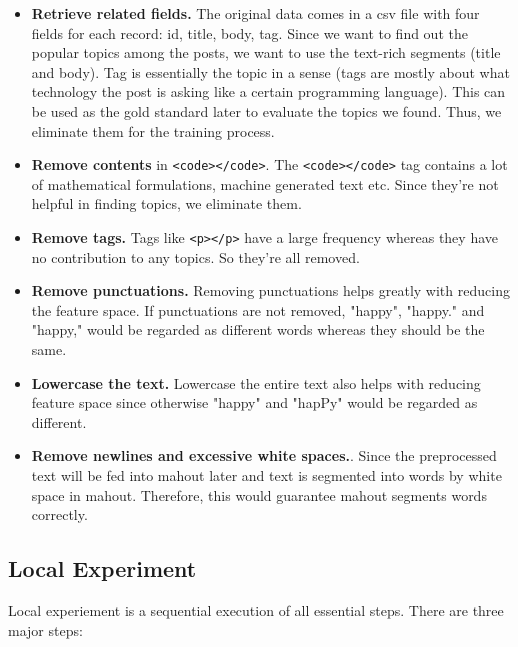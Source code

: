 \documentclass[conference]{IEEEtran}
\begin{document}
\begin{itemize}
	\item \textbf{Retrieve related fields.} The original data comes in a csv file with four fields for each record: id, title, body, tag. Since we want to find out the popular topics among the posts, we want to use the text-rich segments (title and body). Tag is essentially the topic in a sense (tags are mostly about what technology the post is asking like a certain programming language). This can be used as the gold standard later to evaluate the topics we found. Thus, we eliminate them for the training process. 
	\item \textbf{Remove contents} in \verb+<code></code>+. The \verb+<code></code>+ tag contains a lot of mathematical formulations, machine generated text etc. Since they're not helpful in finding topics, we eliminate them.
	\item \textbf{Remove tags.} Tags like \verb+<p></p>+ have a large frequency whereas they have no contribution to any topics. So they're all removed.
	\item \textbf{Remove punctuations.} Removing punctuations helps greatly with reducing the feature space. If punctuations are not removed, "happy", "happy." and "happy," would be regarded as different words whereas they should be the same.
	\item \textbf{Lowercase the text.} Lowercase the entire text also helps with reducing feature space since otherwise "happy" and "hapPy" would be regarded as different.
	\item \textbf{Remove newlines and excessive white spaces.}. Since the preprocessed text will be fed into mahout later and text is segmented into words by white space in mahout. Therefore, this would guarantee mahout segments words correctly.
\end{itemize}

\subsection{Local Experiment}

Local experiement is a sequential execution of all essential steps. There are three major steps:
\end{document}
